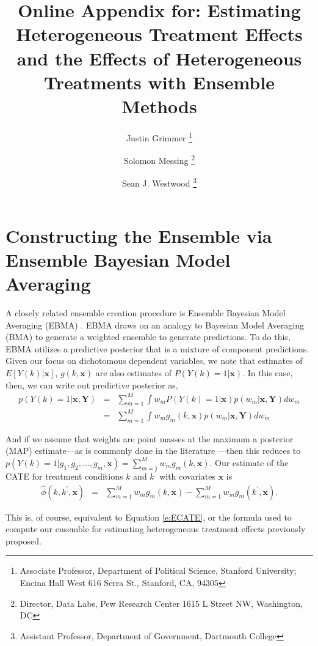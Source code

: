 \documentclass[12pt,letterpaper]{article}
\title{Online Appendix for: Estimating Heterogeneous Treatment Effects and the Effects of Heterogeneous Treatments with Ensemble Methods}
\author{Justin Grimmer \thanks{Associate Professor, Department of
     Political Science, Stanford University; Encina Hall West 616 Serra
     St., Stanford, CA, 94305}
 \and
 Solomon Messing \thanks{Director, Data Labs, Pew Research Center 1615 L Street NW, Washington, DC}
 \and 
 Sean J. Westwood \thanks{Assistant Professor, Department of Government, Dartmouth College}    
     }
\numberwithin{equation}{section}
\numberwithin{equation}{section}
\begin{document}
\maketitle




\section{Constructing the Ensemble via Ensemble Bayesian Model Averaging}\label{s:EBMA}
A closely related ensemble creation procedure is Ensemble Bayesian Model Averaging (EBMA) \citep{Raftery05, MonHolWar12}.  EBMA draws on an analogy to Bayesian Model Averaging (BMA) to generate a weighted ensemble to generate predictions.  To do this, EBMA utilizes a predictive posterior that is a mixture of component predictions.  Given our focus on dichotomous dependent variables, we note that estimates of $E[Y(k)|\boldsymbol{x} ]$, $g(k, \boldsymbol{x})$ are also estimates of $P(Y(k) = 1| \boldsymbol{x})$.  In this case, then, we can write out predictive posterior as, 
\begin{eqnarray}
p(Y(k) = 1| \boldsymbol{x}, \boldsymbol{Y}) & = &  \sum_{m=1}^{M} \int w_{m} P(Y(k) = 1 | \boldsymbol{x}) p(w_{m} | \boldsymbol{x}, \boldsymbol{Y}) dw_{m} \nonumber \\
& = & \sum_{m=1}^{M} \int w_{m} g_{m} (k, \boldsymbol{x} ) p(w_{m} |  \boldsymbol{x}, \boldsymbol{Y}) d w_{m} \nonumber 
\end{eqnarray}

And if we assume that weights are point masses at the maximum a posterior (MAP) estimate---as is commonly done in the literature \citep{Raftery05, MonHolWar12}---then this reduces to  $p(Y(k) = 1| g_{1}, g_{2}, \hdots, g_{m}, \boldsymbol{x})  = \sum_{m=1}^{M} w_{m} g_{m}(k, \boldsymbol{x})$.   Our estimate of the CATE for treatment conditions $k$ and $k^{'}$ with covariates $\boldsymbol{x}$ is 
\begin{eqnarray}
\widehat{\phi}(k, k^{'}, \boldsymbol{x} ) & = & \sum_{m=1}^{M} w_{m} g_{m}(k, \boldsymbol{x}) - \sum_{m=1}^{M} w_{m} g_{m}(k^{'}, \boldsymbol{x}).   
\end{eqnarray}

\noindent This is, of course, equivalent to Equation \ref{e:ECATE}, or the formula used to compute our ensemble for estimating heterogeneous treatment effects previously proposed.    
\end{document}
